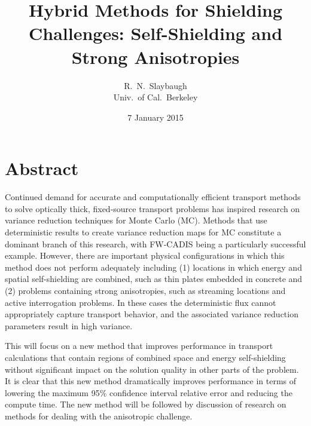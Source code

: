 \documentclass[12pt]{article}
\title{Hybrid Methods for Shielding Challenges: Self-Shielding and Strong Anisotropies}
\author{R.\ N.\ Slaybaugh \\ Univ.\ of Cal.\ Berkeley}
\date{7 January 2015}
\begin{document}
\maketitle

\section*{Abstract}

Continued demand for accurate and computationally efficient transport methods to solve optically thick, fixed-source transport problems has inspired research on variance reduction techniques for Monte Carlo (MC). Methods that use deterministic results to create variance reduction maps for MC constitute a dominant branch of this research, with FW-CADIS being a particularly successful example. However, there are important physical configurations in which this method does not perform adequately including (1) locations in which energy and spatial self-shielding are combined, such as thin plates embedded in concrete and (2) problems containing strong anisotropies, such as streaming locations and active interrogation problems. In these cases the deterministic flux cannot appropriately capture transport behavior, and the associated variance reduction parameters result in high variance. 

This will focus on a new method that improves performance in transport calculations that contain regions of combined space and energy self-shielding without significant impact on the solution quality in other parts of the problem. It is clear that this new method dramatically improves performance in terms of lowering the maximum 95\% confidence interval relative error and reducing the compute time. The new method will be followed by discussion of research on methods for dealing with the anisotropic challenge.

%
\end{document}
